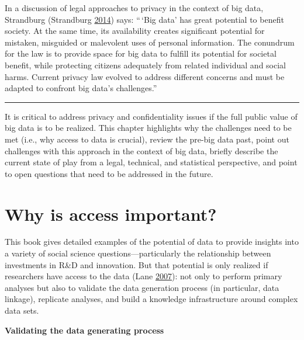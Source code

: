 \documentclass[]{krantz}
\begin{document}
In a discussion of legal approaches to privacy in the context of big
data, Strandburg (Strandburg
\protect\hyperlink{ref-Strandburg2014}{2014}) says: ``\,`Big data' has
great potential to benefit society. At the same time, its availability
creates significant potential for mistaken, misguided or malevolent uses
of personal information. The conundrum for the law is to provide space
for big data to fulfill its potential for societal benefit, while
protecting citizens adequately from related individual and social harms.
Current privacy law evolved to address different concerns and must be
adapted to confront big data's challenges.''

\begin{center}\rule{0.5\linewidth}{\linethickness}\end{center}

It is critical to address privacy and confidentiality issues if the full
public value of big data is to be realized. This chapter highlights why
the challenges need to be met (i.e., why access to data is crucial),
review the pre-big data past, point out challenges with this approach in
the context of big data, briefly describe the current state of play from
a legal, technical, and statistical perspective, and point to open
questions that need to be addressed in the future.

\section{Why is access important?}\label{why-is-access-important}

This book gives detailed examples of the potential of data to provide
insights into a variety of social science questions---particularly the
relationship between investments in R\&D and innovation. But that
potential is only realized if researchers have access to the data (Lane
\protect\hyperlink{ref-Lane2007}{2007}): not only to perform primary
analyses but also to validate the data generation process (in
particular, data linkage), replicate analyses, and build a knowledge
infrastructure around complex data sets.

\textbf{Validating the data generating process}
\end{document}
